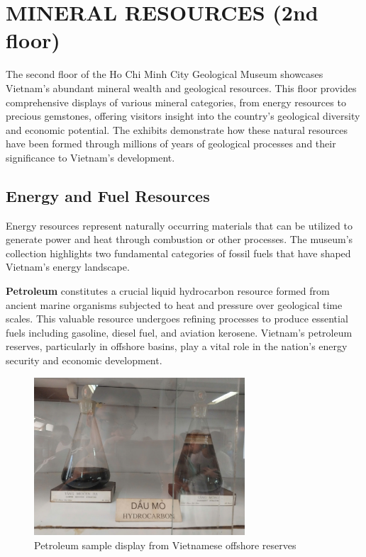 \section{MINERAL RESOURCES (2nd floor)}

The second floor of the Ho Chi Minh City Geological Museum showcases Vietnam's abundant mineral wealth and geological resources. This floor provides comprehensive displays of various mineral categories, from energy resources to precious gemstones, offering visitors insight into the country's geological diversity and economic potential. The exhibits demonstrate how these natural resources have been formed through millions of years of geological processes and their significance to Vietnam's development.

\subsection{Energy and Fuel Resources}

Energy resources represent naturally occurring materials that can be utilized to generate power and heat through combustion or other processes. The museum's collection highlights two fundamental categories of fossil fuels that have shaped Vietnam's energy landscape.

\textbf{Petroleum} constitutes a crucial liquid hydrocarbon resource formed from ancient marine organisms subjected to heat and pressure over geological time scales. This valuable resource undergoes refining processes to produce essential fuels including gasoline, diesel fuel, and aviation kerosene. Vietnam's petroleum reserves, particularly in offshore basins, play a vital role in the nation's energy security and economic development.

\begin{figure}[H]
\centering
\includegraphics[width=0.7\textwidth]{graphics/petroleum_sample.png}
\caption{Petroleum sample display from Vietnamese offshore reserves}
\label{fig:petroleum}
\end{figure}

